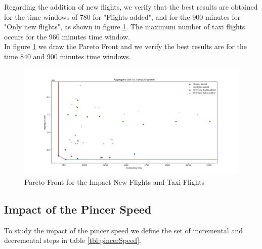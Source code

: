 Regarding the addition of new flights, we verify  that the best results are obtained for the time windows of 780 for "Flights added", and for the 900 minutes for "Only new flights", as shown in figure \ref{fig:costTimeFlights}. The maximum number of taxi flights occurs for the 960 minutes time window.\\

 In figure \ref{fig:costTimeFlights} we draw the Pareto Front and we verify the best results are for the time 840 and 900 minutes time  windows.

	\begin{figure}[h!]
		\centering
		\includegraphics[width=\textwidth]{figures/costTimeFlights.png}
		\caption[]{Pareto Front for the Impact New Flights and Taxi Flights}
		\label{fig:costTimeFlights}
	\end{figure}



\subsection{Impact of the Pincer Speed}\label{sec:pincerSpeed}
To study the impact of the pincer speed we define the set of incremental and decremental steps in table \ref{tbl:pincerSpeed}.

